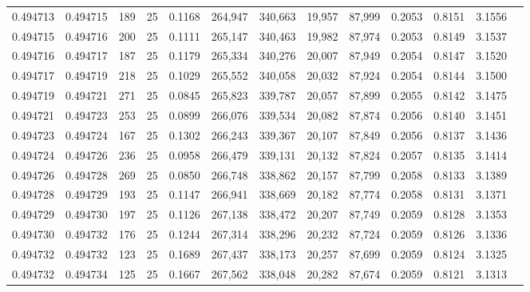 \begin{tabular}{rrrrrrrrrrrrr}
0.494713 & 0.494715 &   189 &  25 &                                     0.1168 & 264,947 & 340,663 &  19,957 &  87,999 & 0.2053 & 0.8151 & 3.1556 \\
0.494715 & 0.494716 &   200 &  25 &                                     0.1111 & 265,147 & 340,463 &  19,982 &  87,974 & 0.2053 & 0.8149 & 3.1537 \\
0.494716 & 0.494717 &   187 &  25 &                                     0.1179 & 265,334 & 340,276 &  20,007 &  87,949 & 0.2054 & 0.8147 & 3.1520 \\
0.494717 & 0.494719 &   218 &  25 &                                     0.1029 & 265,552 & 340,058 &  20,032 &  87,924 & 0.2054 & 0.8144 & 3.1500 \\
0.494719 & 0.494721 &   271 &  25 &                                     0.0845 & 265,823 & 339,787 &  20,057 &  87,899 & 0.2055 & 0.8142 & 3.1475 \\
0.494721 & 0.494723 &   253 &  25 &                                     0.0899 & 266,076 & 339,534 &  20,082 &  87,874 & 0.2056 & 0.8140 & 3.1451 \\
0.494723 & 0.494724 &   167 &  25 &                                     0.1302 & 266,243 & 339,367 &  20,107 &  87,849 & 0.2056 & 0.8137 & 3.1436 \\
0.494724 & 0.494726 &   236 &  25 &                                     0.0958 & 266,479 & 339,131 &  20,132 &  87,824 & 0.2057 & 0.8135 & 3.1414 \\
0.494726 & 0.494728 &   269 &  25 &                                     0.0850 & 266,748 & 338,862 &  20,157 &  87,799 & 0.2058 & 0.8133 & 3.1389 \\
0.494728 & 0.494729 &   193 &  25 &                                     0.1147 & 266,941 & 338,669 &  20,182 &  87,774 & 0.2058 & 0.8131 & 3.1371 \\
0.494729 & 0.494730 &   197 &  25 &                                     0.1126 & 267,138 & 338,472 &  20,207 &  87,749 & 0.2059 & 0.8128 & 3.1353 \\
0.494730 & 0.494732 &   176 &  25 &                                     0.1244 & 267,314 & 338,296 &  20,232 &  87,724 & 0.2059 & 0.8126 & 3.1336 \\
0.494732 & 0.494732 &   123 &  25 &                                     0.1689 & 267,437 & 338,173 &  20,257 &  87,699 & 0.2059 & 0.8124 & 3.1325 \\
0.494732 & 0.494734 &   125 &  25 &                                     0.1667 & 267,562 & 338,048 &  20,282 &  87,674 & 0.2059 & 0.8121 & 3.1313 \\

\end{tabular}
